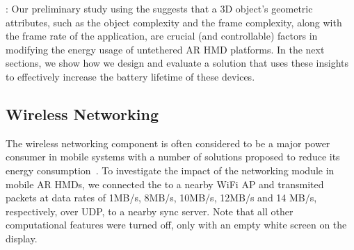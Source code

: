 
%





:
%
Our preliminary study using the \mlo suggests that a 3D object's 
geometric attributes, such as the object complexity and the frame complexity, 
along with the frame rate of the application, are crucial (and controllable) factors in modifying the energy usage of untethered AR HMD platforms. In the next sections, we show how we design and evaluate a solution that uses these insights to effectively increase the battery lifetime of these devices.


\subsection{Wireless Networking}

The wireless networking component is often considered to be a major power 
consumer in mobile systems with a number of solutions proposed to reduce its energy consumption~\cite{salsa,7034998,ALI2016173}. To investigate the impact of the networking module in mobile AR HMDs, we connected the \mlo to a nearby WiFi AP and transmited packets at data rates of 1MB/s, 8MB/s, 10MB/s, 12MB/s and 14 MB/s, respectively, over UDP, to a nearby sync server. %
Note that all other computational features were turned off, only with an empty white screen on the display. 


